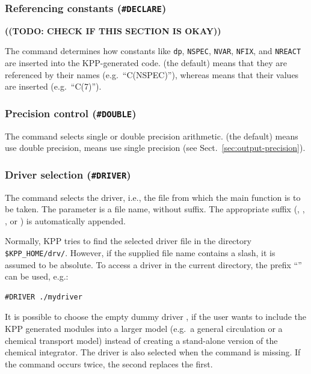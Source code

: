\documentclass[twoside]{article}
\newcommand{\todo}[1]{{{\color{red}\uppercase{\bf ((TODO: #1))}}}}
\begin{document}
\subsubsection{Referencing constants ({\tt\#DECLARE})}
\label{sec:command-declare}

\todo{check if this section is okay}

The  command determines how constants like \verb|dp|,
\verb|NSPEC|, \verb|NVAR|, \verb|NFIX|, and \verb|NREACT| are inserted
into the KPP-generated code.  (the default) means that they
are referenced by their names (e.g.\ ``C(NSPEC)''), whereas 
means that their values are inserted (e.g.\ ``C(7)'').

\subsubsection{Precision control ({\tt\#DOUBLE})}
\label{sec:command-double}

The  command selects single or double precision
arithmetic.  (the default) means use double precision,
 means use single precision (see
Sect.~\ref{sec:output-precision}).

\subsubsection{Driver selection ({\tt\#DRIVER})}
\label{sec:command-driver}

The  command selects the driver, i.e., the file from which
the main function is to be taken. The parameter is a file name, without
suffix. The appropriate suffix (, , ,
or ) is automatically appended.

Normally, KPP tries to find the selected driver file in the directory
\verb|$KPP_HOME/drv/|.
However, if the supplied file name contains a slash, it is assumed to be
absolute. To access a driver in the current directory, the prefix
``'' can be used, e.g.:
%
\begin{verbatim}
#DRIVER ./mydriver
\end{verbatim}
%
It is possible to choose the empty dummy driver , if the user
wants to include the KPP generated modules into a larger model (e.g.\ a
general circulation or a chemical transport model) instead of creating a
stand-alone version of the chemical integrator. The driver 
is also selected when the  command is missing. If the
 command occurs twice, the second replaces the first.
\end{document}
